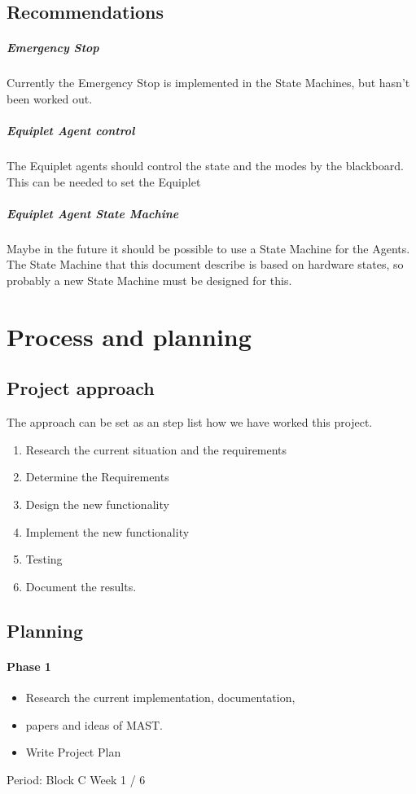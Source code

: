 \documentclass[12pt,a4paper]{report}
\begin{document}
\newpage
\section{Recommendations}
\paragraph{Emergency Stop}
Currently the Emergency Stop is implemented in the State Machines, but hasn't been worked out.

\paragraph{Equiplet Agent control}The Equiplet agents should control the state and the modes by the blackboard. This can be needed to set the Equiplet 

\paragraph{Equiplet Agent State Machine}Maybe in the future it should be possible to use a State Machine for the Agents. The State Machine that this document describe is based on hardware states, so probably a new State Machine must be designed for this.

\chapter{Process and planning}
\section{Project  approach}
The approach can be set as an step list how we have worked this project.
\begin{enumerate}
\item Research the current situation and the requirements
\item Determine the Requirements
\item Design the new functionality
\item Implement the new functionality
\item Testing
\item Document the results.
\end{enumerate}

\newpage
\section{Planning}
\subsubsection{Phase 1}
\begin{itemize}
\item Research the current implementation, documentation, \item papers and ideas of MAST.
\item Write Project Plan
\end{itemize}
Period: Block C Week 1 / 6
\end{document}
